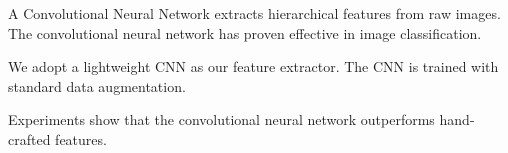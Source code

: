 A Convolutional Neural Network extracts hierarchical features from raw images. The convolutional neural network has proven effective in image classification.

We adopt a lightweight CNN as our feature extractor. The CNN is trained with standard data augmentation.

Experiments show that the convolutional neural network outperforms hand-crafted features.
